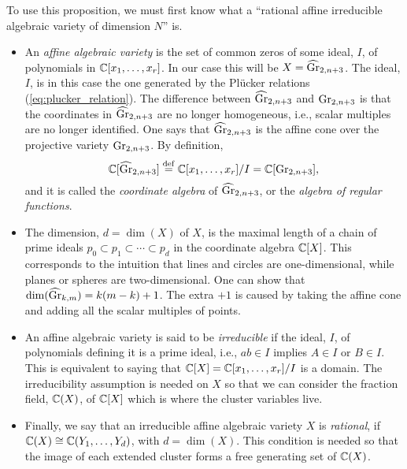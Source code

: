 To use this proposition, we must first know what a ``rational affine irreducible
algebraic variety of dimension $N$'' is.
\begin{itemize}
	\item An \emph{affine algebraic variety} is the set of common zeros of
	      some ideal, $I$, of polynomials in $\mathbb{C}[x_1, \dots, x_r]$. In our case this will be $X
		      = \widehat{\operatorname{Gr}}_{2, n+3}$. The ideal, $I$, is in this case the one generated by the Plücker
	      relations (\cref{eq:plucker_relation}). The difference between $\widehat{\operatorname{Gr}}_{2, n+3}$ and
	      $\operatorname{Gr}_{2,n+3}$ is that the coordinates in $\widehat{\operatorname{Gr}}_{2, n+3}$ are no longer homogeneous,
	      i.e., scalar multiples are no longer identified. One says that $\widehat{\operatorname{Gr}}_{2, n+3}$ is
	      the affine cone over the projective variety $\operatorname{Gr}_{2,n+3}$. By definition,
	      \begin{equation*}
		      \mathbb{C}[\widehat{\operatorname{Gr}}_{2, n+3}] \overset{\mathrm{def}}{=} \mathbb{C}[x_1, \dots, x_r]/I = \mathbb{C}[\operatorname{Gr}_{2, n+3}],
	      \end{equation*}
	      and it is called the \emph{coordinate algebra} of $\widehat{\operatorname{Gr}}_{2, n+3}$, or the \emph{algebra of
		      regular functions}.
	\item The dimension, $d = \dim(X)$ of $X$, is the maximal length of a chain of prime ideals
	      $p_0 \subset p_1 \subset \dotsb \subset p_d$ in the coordinate algebra $\mathbb{C}[X]$. This
	      corresponds to the intuition that lines and circles are one-dimensional, while planes
	      or spheres are two-dimensional. One can show that $\dim(\widehat{\operatorname{Gr}}_{k,m}) = k(m-k) + 1$.
	      The extra $+1$ is caused by taking the affine cone and adding all the scalar multiples
	      of points.
	\item An affine algebraic variety is said to be \emph{irreducible}
	      if the ideal, $I$, of polynomials defining it is a prime ideal, i.e., $ab \in I$
	      implies $A\in I$ or $B \in I$. This is equivalent to saying that $\mathbb{C}[X] = \mathbb{C}[x_1,
			      \dots, x_r]/I$ is a domain. The irreducibility assumption is needed on $X$ so that we
	      can consider the fraction field, $\mathbb{C}(X)$, of $\mathbb{C}[X]$ which is where the cluster
	      variables live.
	\item Finally, we say that an irreducible affine algebraic variety $X$ is
	      \emph{rational}, if $\mathbb{C}(X) \cong \mathbb{C}(Y_1, \dots, Y_d)$, with
	      $d = \dim(X)$. This condition is needed so that the image of each extended cluster
	      forms a free generating set of $\mathbb{C}(X)$.
\end{itemize}

